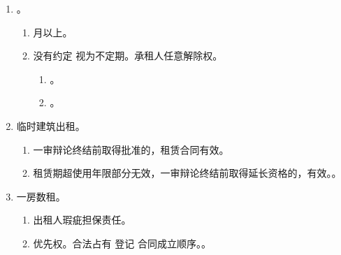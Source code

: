 \begin{enumerate}
        \begin{enumerate}
          \item {} \yjt 都有过错按份。
          \item {}。
          \item {}。
        \end{enumerate}
  \item {}。
        \begin{enumerate}
          \item {} 月以上。
          \item 没有约定 \hz {}视为不定期。承租人任意解除权。
                \begin{enumerate}
                  \item {}。
                  \item {}。
                \end{enumerate}
        \end{enumerate}
  \item 临时建筑出租。
        \begin{enumerate}
          \item 一审辩论终结前取得批准的，租赁合同有效。
          \item 租赁期超使用年限部分无效，一审辩论终结前取得延长资格的，有效。。
        \end{enumerate}
  \item 一房数租。
        \begin{enumerate}
          \item 出租人瑕疵担保责任。
          \item 优先权。合法占有 \dy 登记 \dy 合同成立顺序。。
        \end{enumerate}
\end{enumerate}
